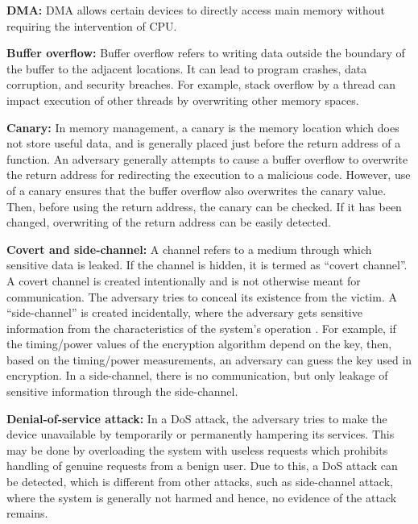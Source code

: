 \textbf{DMA:} DMA allows certain devices to directly access main memory without requiring the intervention of CPU. 
  
\textbf{Buffer overflow:} Buffer overflow refers to writing data outside the boundary of the buffer to the adjacent locations. It can lead to program crashes, data corruption, and security breaches. For example, stack overflow by a thread can impact execution of other threads by overwriting other memory spaces.  

\textbf{Canary:} In memory management, a canary is the memory location which does not store useful data, and is generally placed just before the return address of a function. An adversary generally attempts to cause a buffer overflow to overwrite the return address for redirecting the execution to a malicious code. However, use of a canary ensures that the buffer overflow also overwrites the canary value. Then, before using the return address, the canary can be  checked. If it has been changed, overwriting of the return address can be easily detected. 

\textbf{Covert and side-channel:} A channel refers to a medium through which sensitive data is leaked. If the channel is hidden, it is termed as ``covert channel''. A covert channel is created intentionally and is not otherwise meant for communication. The adversary tries to conceal its existence from the victim.   A ``side-channel'' is created incidentally, where the adversary gets sensitive information from the characteristics of the system's operation \cite{wang2006covert}. For example,  if the timing/power values of the encryption algorithm depend on the key, then, based on the timing/power measurements, an adversary can guess the key used in encryption.  In a side-channel, there is no communication, but only leakage of sensitive information through the side-channel. 

 

\textbf{Denial-of-service attack:} In a DoS attack, the adversary tries to make the device unavailable by temporarily or permanently hampering its services. This may be done by overloading the system with useless requests which prohibits handling of genuine requests from a benign user. Due to this, a DoS attack can be detected, which is different from other attacks, such as side-channel attack, where the system is generally not harmed and hence, no evidence of the attack remains.
 

 

 
  
